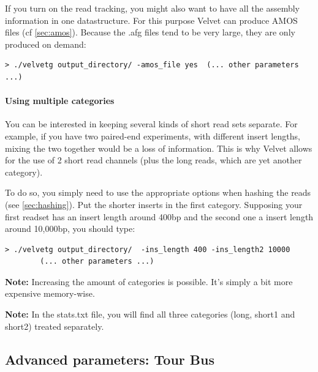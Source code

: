 \documentclass{article}
\begin{document}
If you turn on the read tracking, you might also want to have all the  assembly information in one datastructure. For this purpose Velvet can produce AMOS files (cf \ref{sec:amos}). Because the .afg files tend to be very large, they are only produced on demand:

\begin{verbatim}
> ./velvetg output_directory/ -amos_file yes  (... other parameters ...)
\end{verbatim}

	\paragraph{Using multiple categories}

You can be interested in keeping several kinds of short read sets separate.
For example, if you have two paired-end experiments, with different insert
lengths, mixing the two together would be a loss of information. This is why
Velvet allows for the use of 2 short read channels (plus the long reads, which
are yet another category).

To do so, you simply need to use the appropriate options when hashing the
reads (see \ref{sec:hashing}). Put the shorter inserts in the first category. Supposing your first  readset has an insert length around 400bp and the second one a insert length around 10,000bp, you should type:

\begin{verbatim}
> ./velvetg output_directory/  -ins_length 400 -ins_length2 10000  
		(... other parameters ...)
\end{verbatim}

\textbf{Note:} Increasing the amount of categories is possible. It's simply a bit more
expensive memory-wise. 

\textbf{Note:} In the stats.txt file, you will find all three categories (long,
short1 and short2) treated separately.

\subsection{Advanced parameters: Tour Bus}
\end{document}
